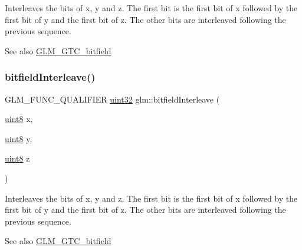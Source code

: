 Interleaves the bits of x, y and z. The first bit is the first bit of x followed by the first bit of y and the first bit of z. The other bits are interleaved following the previous sequence.

\begin{DoxySeeAlso}{See also}
\hyperlink{group__gtc__bitfield}{G\+L\+M\+\_\+\+G\+T\+C\+\_\+bitfield} 
\end{DoxySeeAlso}
\mbox{\label{group__gtc__bitfield_gab9d593a2e916beb8f8137a0dbeae3afe}} 
\subsubsection{\texorpdfstring{bitfield\+Interleave()}{bitfieldInterleave()}\hspace{0.1cm}{\footnotesize\ttfamily [8/16]}}
{\footnotesize\ttfamily G\+L\+M\+\_\+\+F\+U\+N\+C\+\_\+\+Q\+U\+A\+L\+I\+F\+I\+ER \hyperlink{group__gtc__type__precision_ga202b6a53c105fcb7e531f9b443518451}{uint32} glm\+::bitfield\+Interleave (\begin{DoxyParamCaption}\item[{\hyperlink{group__gtc__type__precision_ga1a7dcd8aac97cc8020817c94049deff2}{uint8}}]{x,  }\item[{\hyperlink{group__gtc__type__precision_ga1a7dcd8aac97cc8020817c94049deff2}{uint8}}]{y,  }\item[{\hyperlink{group__gtc__type__precision_ga1a7dcd8aac97cc8020817c94049deff2}{uint8}}]{z }\end{DoxyParamCaption})}

Interleaves the bits of x, y and z. The first bit is the first bit of x followed by the first bit of y and the first bit of z. The other bits are interleaved following the previous sequence.

\begin{DoxySeeAlso}{See also}
\hyperlink{group__gtc__bitfield}{G\+L\+M\+\_\+\+G\+T\+C\+\_\+bitfield} 
\end{DoxySeeAlso}
\mbox{\label{group__gtc__bitfield_gaf898f842ac089fcc8d6201c32702584a}} 
